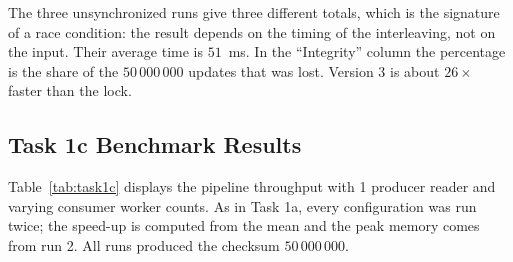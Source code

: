 \documentclass[11pt,a4paper]{article}
\begin{document}
The three unsynchronized runs give three different totals, which is the signature of a race condition: the result depends on the timing of the interleaving, not on the input. Their average time is $51$~ms. In the ``Integrity'' column the percentage is the share of the $50\,000\,000$ updates that was lost. Version 3 is about $26\times$ faster than the lock.

\subsection{Task 1c Benchmark Results}
Table~\ref{tab:task1c} displays the pipeline throughput with 1 producer reader and varying consumer worker counts. As in Task 1a, every configuration was run twice; the speed-up is computed from the mean and the peak memory comes from run 2. All runs produced the checksum $50\,000\,000$.

\begin{table}[H]
\centering
\caption{Task 1c: Producer-Consumer Throughput and Memory vs. Consumer Workers}
\label{tab:task1c}
\vspace{2mm}
\small
\setlength{\tabcolsep}{5pt}
\end{table}
\end{document}

